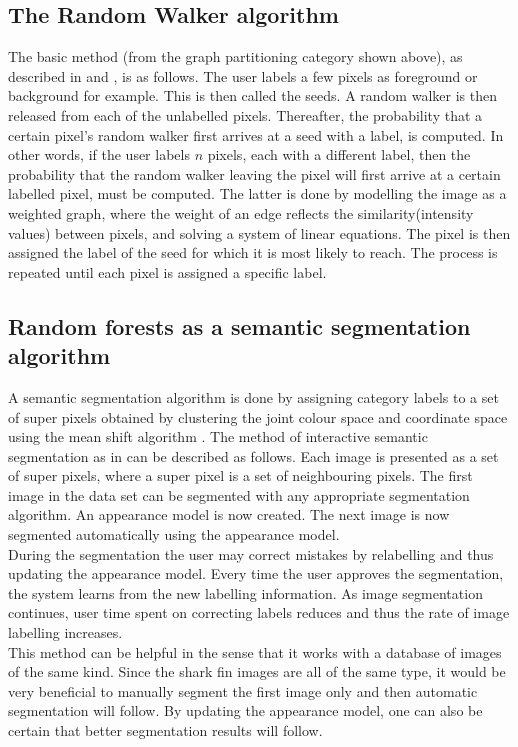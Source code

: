 \documentclass[a4paper,10pt]{article}
\begin{document}
\subsection{The Random Walker algorithm}
The basic method (from the graph partitioning category shown above), as described in \cite{rw} and \cite{rw1}, is as follows.  The user labels a few pixels as foreground or background for example.  This is then called the seeds.  A random walker is then released from each of the unlabelled pixels.  Thereafter, the probability that a certain pixel's random walker first arrives at a seed with a label, is computed.  In other words, if the user labels $n$ pixels, each with a different label, then the probability that the random walker leaving the pixel will first arrive at a certain labelled pixel, must be computed.  The latter is done by modelling the image as a weighted graph, where the weight of an edge reflects the similarity(intensity values) between pixels, and solving a system of linear equations.  The pixel is then assigned the label of the seed for which it is most likely to reach.  The process is repeated until each pixel is assigned a specific label. 

\subsection{Random forests as a semantic segmentation algorithm}
A semantic segmentation algorithm is done by assigning category labels to a set of super pixels obtained by clustering the joint colour space and coordinate space using the mean shift algorithm \cite{ms}.
The method of interactive semantic segmentation as in \cite{RF} can be described as follows.  Each image is presented as a set of super pixels, where a super pixel is a set of neighbouring pixels.  The first image in the data set can be segmented with any appropriate segmentation algorithm.  An appearance model is now created.  The next image is now segmented automatically using the appearance model. \\  

\noindent During the segmentation the user may correct mistakes by relabelling and thus updating the appearance model.  Every time the user approves the segmentation, the system learns from the new labelling information. As image segmentation continues, user time spent on correcting labels reduces and thus the rate of image labelling increases.  \\

\noindent This method can be helpful in the sense that it works with a database of images of the same kind.  Since the shark fin images are all of the same type, it would be very beneficial to manually segment the first image only and then automatic segmentation will follow.  By updating the appearance model, one can also be certain that better segmentation results will follow.  \\  
\end{document}
